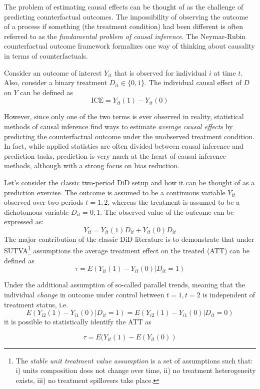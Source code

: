 \documentclass[hidelinks]{article}\usepackage[]{graphicx}\usepackage[]{color}
\begin{document}
The problem of estimating causal effects can be thought of as the challenge of predicting counterfactual outcomes. The impossibility of observing the outcome of a process if something (the treatment condition) had been different is often referred to as the \textit{fundamental problem of causal inference}. The Neymar-Rubin counterfactual outcome framework formalizes one way of thinking about causality in terms of counterfactuals. 

Consider an outcome of interest $Y_{it}$ that is observed for individual $i$ at time $t$. Also, consider a binary treatment $D_{it} \in \{ 0, 1 \}$. The individual causal effect of $D$ on $Y$ can be defined as 
$$\text{ICE} = Y_{it}(1) - Y_{it}(0)$$

However, since only one of the two terms is ever observed in reality, statistical methods of causal inference find ways to estimate \textit{average causal effects} by predicting the counterfactual outcome under the unobserved treatment condition. In fact, while applied statistics are often divided between causal inference and prediction tasks, prediction is very much at the heart of causal inference methods, although with a strong focus on bias reduction.

Let's consider the classic two-period DiD setup and how it can be thought of as a prediction exercise. The outcome is assumed to be a continuous variable $Y_{it}$ observed over two periods $t=1, 2$, whereas the treatment is assumed to be a dichotomous variable $D_{it} = 0, 1$. The observed value of the outcome can be expressed as:
$$ Y_{it} = Y_{it}(1)D_{it} + Y_{it}(0)D_{it} $$
The major contribution of the classic DiD literature \parencite[e.g.,]{Angrist2009} is to demonstrate that under SUTVA\footnote{The \textit{stable unit treatment value assumption} is a set of assumptions such that: i) units composition does not change over time, ii) no treatment heterogeneity exists, iii) no treatment spillovers take place.} assumptions the average treatment effect on the treated (ATT) can be defined as
$$ \tau = E(Y_{it} (1) - Y_{it}(0) | D_{it} = 1) $$

Under the additional assumption of so-called parallel trends, meaning that the individual \textit{change} in outcome under control between $t = 1, t= 2$ is independent of treatment status, i.e.
$$ E(Y_{i2} (1) - Y_{i1}(0) | D_{it} = 1) = E(Y_{i2} (1) - Y_{i1}(0) | D_{it} = 0) $$
it is possible to statistically identify the ATT as

$$ \tau = E(Y_{it}(1) - E(Y_{it}(0))$$
\end{document}
